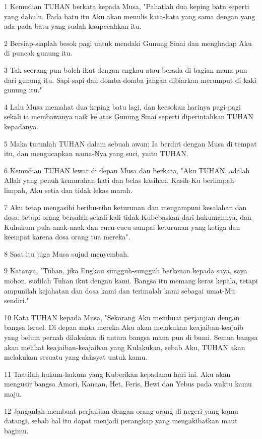\par 1 Kemudian TUHAN berkata kepada Musa, "Pahatlah dua keping batu seperti yang dahulu. Pada batu itu Aku akan menulis kata-kata yang sama dengan yang ada pada batu yang sudah kaupecahkan itu.
\par 2 Bersiap-siaplah besok pagi untuk mendaki Gunung Sinai dan menghadap Aku di puncak gunung itu.
\par 3 Tak seorang pun boleh ikut dengan engkau atau berada di bagian mana pun dari gunung itu. Sapi-sapi dan domba-domba jangan dibiarkan merumput di kaki gunung itu."
\par 4 Lalu Musa memahat dua keping batu lagi, dan keesokan harinya pagi-pagi sekali ia membawanya naik ke atas Gunung Sinai seperti diperintahkan TUHAN kepadanya.
\par 5 Maka turunlah TUHAN dalam sebuah awan; Ia berdiri dengan Musa di tempat itu, dan mengucapkan nama-Nya yang suci, yaitu TUHAN.
\par 6 Kemudian TUHAN lewat di depan Musa dan berkata, "Aku TUHAN, adalah Allah yang penuh kemurahan hati dan belas kasihan. Kasih-Ku berlimpah-limpah, Aku setia dan tidak lekas marah.
\par 7 Aku tetap mengasihi beribu-ribu keturunan dan mengampuni kesalahan dan dosa; tetapi orang bersalah sekali-kali tidak Kubebaskan dari hukumannya, dan Kuhukum pula anak-anak dan cucu-cucu sampai keturunan yang ketiga dan keempat karena dosa orang tua mereka".
\par 8 Saat itu juga Musa sujud menyembah.
\par 9 Katanya, "Tuhan, jika Engkau sungguh-sungguh berkenan kepada saya, saya mohon, sudilah Tuhan ikut dengan kami. Bangsa itu memang keras kepala, tetapi ampunilah kejahatan dan dosa kami dan terimalah kami sebagai umat-Mu sendiri."
\par 10 Kata TUHAN kepada Musa, "Sekarang Aku membuat perjanjian dengan bangsa Israel. Di depan mata mereka Aku akan melakukan keajaiban-keajaib yang belum pernah dilakukan di antara bangsa mana pun di bumi. Semua bangsa akan melihat keajaiban-keajaiban yang Kulakukan, sebab Aku, TUHAN akan melakukan sesuatu yang dahsyat untuk kamu.
\par 11 Taatilah hukum-hukum yang Kuberikan kepadamu hari ini. Aku akan mengusir bangsa Amori, Kanaan, Het, Feris, Hewi dan Yebus pada waktu kamu maju.
\par 12 Janganlah membuat perjanjian dengan orang-orang di negeri yang kamu datangi, sebab hal itu dapat menjadi perangkap yang mengakibatkan maut bagimu.

